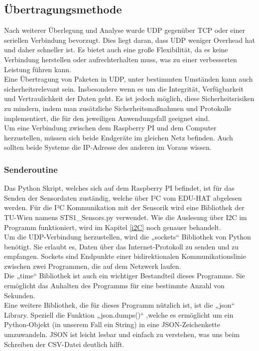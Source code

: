 \newpage
\subsection{Übertragungsmethode } \label{über}
Nach weiterer Überlegung und Analyse wurde UDP gegenüber TCP oder einer seriellen Verbindung bevorzugt. Dies liegt daran, dass UDP weniger Overhead hat und daher schneller ist. Es bietet auch eine große Flexibilität, da es keine Verbindung herstellen oder aufrechterhalten muss, was zu einer verbesserten Leistung führen kann.\\
\vspace{3mm}
Eine Übertragung von Paketen in UDP, unter bestimmten Umständen kann auch sicherheitsrelevant sein. Insbesondere wenn es um die Integrität, Verfügbarkeit und Vertraulichkeit der Daten geht. Es ist jedoch möglich, diese Sicherheitsrisiken zu mindern, indem man zusätzliche Sicherheitsmaßnahmen und Protokolle implementiert, die für den jeweiligen Anwendungsfall geeignet sind. \\
\vspace{3mm}
Um eine Verbindung zwischen dem Raspberry PI und dem Computer herzustellen, müssen sich beide Endgeräte im gleichen Netz befinden. Auch sollten beide Systeme die IP-Adresse des anderen im Voraus wissen. 

\subsubsection{Senderoutine }\label{sende}
Das Python Skript, welches sich auf dem Raspberry PI befindet, ist für das Senden der Sensordaten zuständig, welche über I²C vom EDU-HAT abgelesen werden. Für die I²C Kommunikation mit der Sensorik wird eine Bibliothek der TU-Wien namens STS1\_Sensors.py verwendet. Wie die Auslesung über I2C im Programm funktioniert, wird im Kapitel \ref{i2C} noch genauer behandelt.\\
\vspace{3mm}
Um die UDP-Verbindung herzustellen, wird die „sockets“ Bibliothek von Python benötigt. Sie erlaubt es, Daten über das Internet-Protokoll zu senden und zu empfangen. Sockets sind Endpunkte einer bidirektionalen Kommunikationslinie zwischen zwei Programmen, die auf dem Netzwerk laufen.\\
\vspace{3mm}
Die „time“ Bibliothek ist auch ein wichtiger Bestandteil dieses Programms. Sie ermöglicht das Anhalten des Programms für eine bestimmte Anzahl von Sekunden. \\
\vspace{3mm}
Eine weitere Bibliothek, die für dieses Programm nützlich ist, ist die „json“ Library. Speziell die Funktion „json.dumps()“ ,welche es ermöglicht  um ein Python-Objekt (in unserem Fall ein String) in eine JSON-Zeichenkette umzuwandeln. JSON ist leicht lesbar und einfach zu verstehen, was uns beim Schreiben der CSV-Datei deutlich hilft. 
\newpage
